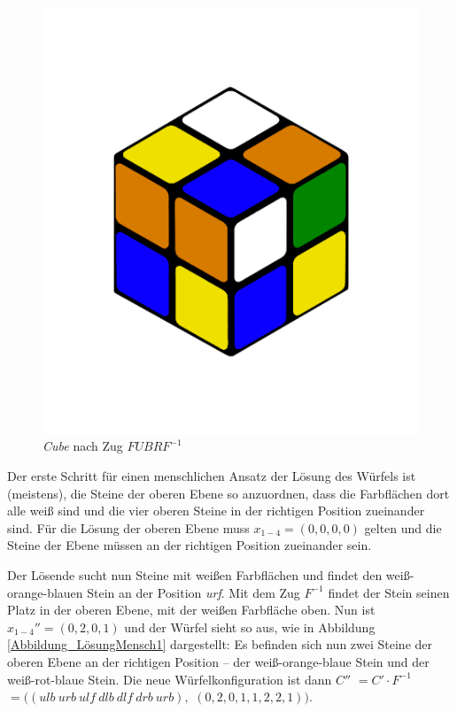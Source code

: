 \documentclass[12pt,a4paper, usenames, dvipsnames]{article}
\theoremstyle{mystyle}
\theoremstyle{definition}
\begin{document}
\begin{figure}[H]
\centering
\includegraphics[scale=0.12]{LURFL1.png}
\caption{\textit{Cube} nach Zug $FUBRF^{-1}$ }
\label{Abbildung_LösungMensch0}
\end{figure}

Der erste Schritt für einen menschlichen Ansatz der Lösung des Würfels ist (meistens), die Steine der oberen Ebene so anzuordnen, dass die Farbflächen dort alle weiß sind und die vier oberen Steine in der richtigen Position zueinander sind. 
Für die Lösung der oberen Ebene muss $x_{1-4} = (0,0,0,0)$ gelten und die Steine der Ebene müssen an der richtigen Position zueinander sein.

Der Lösende sucht nun Steine mit weißen Farbflächen und findet den weiß-orange-blauen Stein an der Position \textit{urf}. 
Mit dem Zug $F^{-1}$ findet der Stein seinen Platz in der oberen Ebene, mit der weißen Farbfläche oben. 
Nun ist $x_{1-4}''=(0,2,0,1)$ und der Würfel sieht so aus, wie in Abbildung \ref{Abbildung_LösungMensch1} dargestellt: Es befinden sich nun zwei Steine der oberen Ebene an der richtigen Position -- der weiß-orange-blaue Stein und der weiß-rot-blaue Stein. Die neue Würfelkonfiguration ist dann $C'' $ $= C' \cdot F^{-1} $ $= ((\textit{ulb} \ \textit{urb} \ \textit{ulf} \ \textit{dlb} \ \textit{dlf} \ \textit{drb} \ \textit{urb}),$ $(0,2,0,1,1,2,2,1))$.
\end{document}
